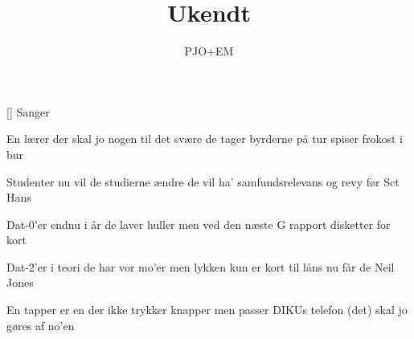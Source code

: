 \documentclass[a4paper,11pt]{article}
\title{Ukendt}
\author{PJO+EM}
\begin{document}
\maketitle

\begin{roles}
[] Sanger 
\end{roles}

\begin{song}
   En lærer
            der skal jo nogen til det svære
            de tager byrderne på tur
            spiser frokost i bur

   Studenter
            nu vil de studierne ændre
            de vil ha' samfundsrelevans
            og revy før Sct Hans

   Dat-0'er
            endnu i år de laver huller
            men ved den næste G rapport
            disketter for kort

   Dat-2'er
            i teori de har vor mo'er
            men lykken kun er kort til låns
            nu får de Neil Jones

   En tapper
            er en der ikke trykker knapper
            men passer DIKUs telefon
            (det) skal jo gøres af no'en
\end{song}
\end{document}
